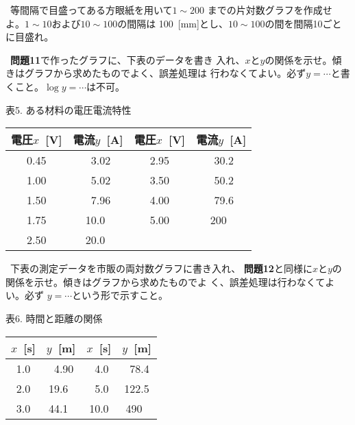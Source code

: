 \documentclass[11pt,a4,epsf]{jarticle}
\begin{document}
\bigskip

\noindent {\bf [問題11]}~等間隔で目盛ってある方眼紙を用いて$1 \sim 200$
までの片対数グラフを作成せよ。$1 \sim10$および$10 \sim 100$の間隔は
100~[mm]とし、$10 \sim 100$の間を間隔10ごとに目盛れ。

\bigskip

\newpage

\noindent {\bf [問題12]}~{\bf 問題11}で作ったグラフに、下表のデータを書き
入れ、$x$と$y$の関係を示せ。傾きはグラフから求めたものでよく、誤差処理は
行わなくてよい。必ず$y=\cdots$と書くこと。$\log y=\cdots$は不可。

\begin{center}

表5. ある材料の電圧電流特性

\vspace{0.2cm}
\begin{tabular}{||c|c||c|c||} \hline
電圧$x$~[V] & 電流$y$~[A] & 電圧$x$~[V] & 電流$y$~[A] \\  
\hline
0.45   &  ~3.02  &  2.95  &  ~30.2 \\ \hline
1.00   &  ~5.02  &  3.50  &  ~50.2 \\ \hline
1.50   &  ~7.96  &  4.00  &  ~79.6 \\ \hline
1.75   &  10.0~  &  5.00  &  200~  \\ \hline
2.50   &  20.0~  &        &        \\ \hline
\end{tabular}

\end{center}

\bigskip

\noindent {\bf [問題13]}~下表の測定データを市販の両対数グラフに書き入れ、
{\bf 問題12}と同様に$x$と$y$の関係を示せ。傾きはグラフから求めたものでよ
く、誤差処理は行わなくてよい。必ず $y=\cdots$という形で示すこと。

\begin{center}

表6. 時間と距離の関係

\vspace{0.2cm}
\begin{tabular}{||c|c||c|c||} \hline
$x$~[s] & $y$~[m] & $x$~[s] & $y$~[m] \\ \hline
1.0   &  ~4.90  &  ~4.0  &  ~78.4 \\ \hline
2.0   &  19.6~  &  ~5.0  &  122.5 \\ \hline
3.0   &  44.1~  &  10.0  &  490~  \\ \hline
\end{tabular}

\end{center}
\end{document}
